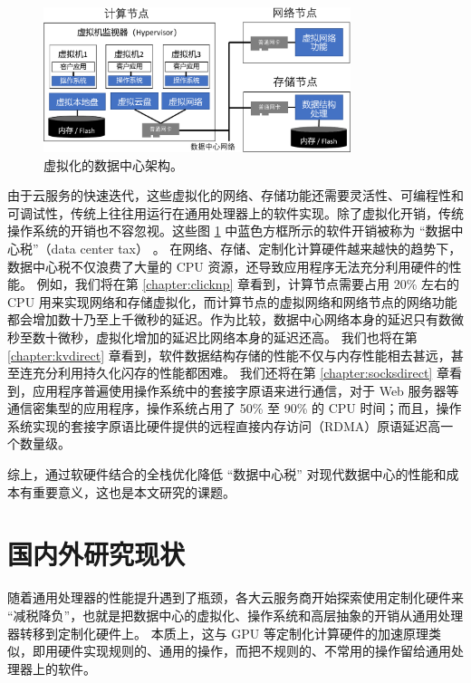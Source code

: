 \begin{figure}[htbp]
	\centering
	\includegraphics[width=0.8\textwidth]{figures/virt_arch.pdf}
	\caption{虚拟化的数据中心架构。}
	\label{intro:fig:virt-architecture}
\end{figure}


由于云服务的快速迭代，这些虚拟化的网络、存储功能还需要灵活性、可编程性和可调试性，传统上往往用运行在通用处理器上的软件实现。除了虚拟化开销，传统操作系统的开销也不容忽视。这些图 \ref{intro:fig:virt-architecture} 中蓝色方框所示的软件开销被称为 ``数据中心税''（data center tax） \cite{barroso2009datacenter,barroso2013datacenter,barroso2017attack,barroso2018datacenter}。
在网络、存储、定制化计算硬件越来越快的趋势下，数据中心税不仅浪费了大量的 CPU 资源，还导致应用程序无法充分利用硬件的性能。
例如，我们将在第 \ref{chapter:clicknp} 章看到，计算节点需要占用 20\% 左右的 CPU 用来实现网络和存储虚拟化，而计算节点的虚拟网络和网络节点的网络功能都会增加数十乃至上千微秒的延迟。作为比较，数据中心网络本身的延迟只有数微秒至数十微秒，虚拟化增加的延迟比网络本身的延迟还高。
我们也将在第 \ref{chapter:kvdirect} 章看到，软件数据结构存储的性能不仅与内存性能相去甚远，甚至连充分利用持久化闪存的性能都困难。
我们还将在第 \ref{chapter:socksdirect} 章看到，应用程序普遍使用操作系统中的套接字原语来进行通信，对于 Web 服务器等通信密集型的应用程序，操作系统占用了 50\% 至 90\% 的 CPU 时间；而且，操作系统实现的套接字原语比硬件提供的远程直接内存访问（RDMA）原语延迟高一个数量级。

综上，通过软硬件结合的全栈优化降低 ``数据中心税'' 对现代数据中心的性能和成本有重要意义，这也是本文研究的课题。





\section{国内外研究现状}


随着通用处理器的性能提升遇到了瓶颈，各大云服务商开始探索使用定制化硬件来 ``减税降负''，也就是把数据中心的虚拟化、操作系统和高层抽象的开销从通用处理器转移到定制化硬件上。
本质上，这与 GPU 等定制化计算硬件的加速原理类似，即用硬件实现规则的、通用的操作，而把不规则的、不常用的操作留给通用处理器上的软件。

